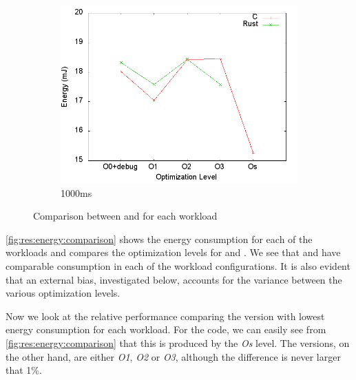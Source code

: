 \begin{figure}[H]
  \begin{subfigure}{0.40\textwidth}
    \includegraphics[width=\textwidth]{results/plots/energy/1000.png}
    \caption{1000ms}
  \end{subfigure}

  \caption{Comparison between {\rust} and {\C} for each workload}
  \label{fig:res:energy:comparison}
\end{figure}

\autoref{fig:res:energy:comparison} shows the energy consumption for each of the workloads and compares the optimization levels for {\rust} and {\C}.
We see that {\rust} and {\C} have comparable consumption in each of the workload configurations.
It is also evident that an external bias, investigated below, accounts for the variance between the various optimization levels.

Now we look at the relative performance comparing the version with lowest energy consumption for each workload.
For the {\C} code, we can easily see from \autoref{fig:res:energy:comparison} that this is produced by the \emph{Os} level.
The {\rust} versions, on the other hand, are either \emph{O1}, \emph{O2} or \emph{O3}, although the difference is never larger that 1\%.

